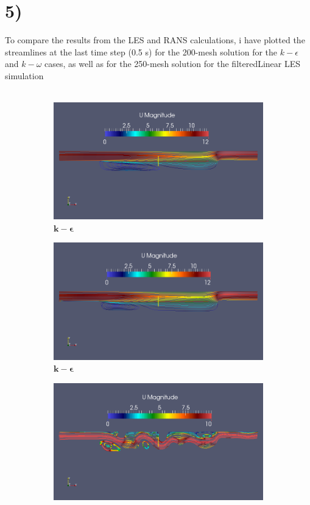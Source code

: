 \documentclass[a4paper,english,12pt,twoside]{article}
\begin{document}
\section*{5)}
To compare the results from the LES and RANS calculations, i have plotted the streamlines at the last time step (0.5 s) for the 200-mesh solution for the $k-\epsilon$ and $k-\omega$ cases, as well as for the 250-mesh solution for the filteredLinear LES simulation\\
\\
\begin{figure}[h!]
	\begin{subfigure}{0.3\linewidth}
		\includegraphics[width=0.95\linewidth]{simple_ke_20_streamlines.png}
		\caption{$\mathbf{k-\epsilon}$}
	\end{subfigure}
	\begin{subfigure}{0.3\linewidth}
		\includegraphics[width=0.95\linewidth]{simple_ko_20_streamlines.png}
		\caption{$\mathbf{k-\epsilon}$}
	\end{subfigure}
	\begin{subfigure}{0.3\linewidth}
		\includegraphics[width=0.95\linewidth]{piso_25_filteredLinear_streamlines.png}

\end{subfigure}
\end{figure}
\end{document}
